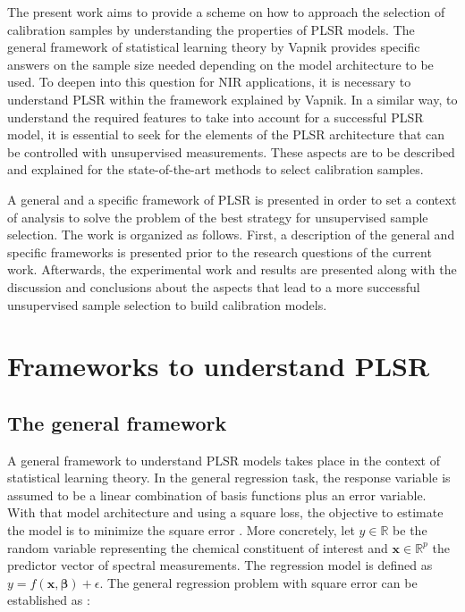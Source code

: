 \documentclass[journal=ancham,manuscript=article]{achemso}
\begin{document}
The present work aims to provide a scheme on how to approach the selection of calibration samples by understanding the properties of PLSR models. The general framework of statistical learning theory by Vapnik provides specific answers on the sample size needed depending on the model architecture to be used\cite{Vapnik2019, Vapnik2000}. To deepen into this question for NIR applications, it is necessary to understand PLSR within the framework explained by Vapnik. In a similar way, to understand the required features to take into account for a successful PLSR model, it is essential to seek for the elements of the PLSR architecture that can be controlled with unsupervised measurements. These aspects are to be described and explained for the state-of-the-art methods to select calibration samples.

A general and a specific framework of PLSR is presented in order to set a context of analysis to solve the problem of the best strategy for unsupervised sample selection. The work is organized as follows. First, a description of the general and specific frameworks is presented prior to the research questions of the current work. Afterwards, the experimental work and results are presented along with the discussion and conclusions about the aspects that lead to a more successful unsupervised sample selection to build calibration models.


\section{Frameworks to understand PLSR}

\subsection{The general framework}

A general framework to understand PLSR models takes place in the context of statistical learning theory. In the general regression task, the response variable is assumed to be a linear combination of basis functions plus an error variable. With that model architecture and using a square loss, the objective to estimate the model is to minimize the square error \cite{Vapnik2019}. More concretely, let $y \in \mathbb{R}$ be the random variable representing the chemical constituent of interest and  $\mathbf{x} \in \mathbb{R}^{p}$ the predictor vector of spectral measurements. The regression model is defined as $ y = f(\mathbf{x}, \boldsymbol{\beta}) + \epsilon$.  The general regression problem with square error can be established as \cite{Vapnik2000}:
\end{document}

